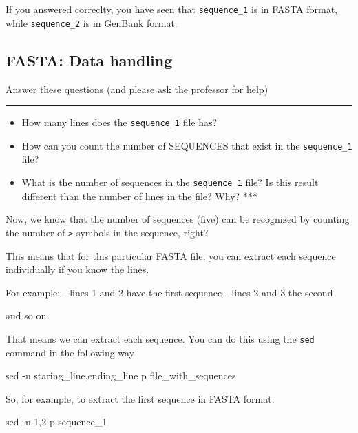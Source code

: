 \documentclass[
]{book}
\newenvironment{Shaded}{\begin{snugshade}}{\end{snugshade}}
\newcommand{\AttributeTok}[1]{\textcolor[rgb]{0.77,0.63,0.00}{#1}}
\newcommand{\FunctionTok}[1]{\textcolor[rgb]{0.00,0.00,0.00}{#1}}
\newcommand{\NormalTok}[1]{#1}
\newcommand{\StringTok}[1]{\textcolor[rgb]{0.31,0.60,0.02}{#1}}
\providecommand{\tightlist}{%
  \setlength{\itemsep}{0pt}\setlength{\parskip}{0pt}}
\begin{document}
If you answered correclty, you have seen that \texttt{sequence\_1} is in FASTA format, while \texttt{sequence\_2} is in GenBank format.

\hypertarget{fasta-data-handling}{%
\subsection{FASTA: Data handling}\label{fasta-data-handling}}

Answer these questions (and please ask the professor for help)

\begin{center}\rule{0.5\linewidth}{0.5pt}\end{center}

\begin{itemize}
\tightlist
\item
  How many lines does the \texttt{sequence\_1} file has?
\item
  How can you count the number of SEQUENCES that exist in the \texttt{sequence\_1} file?
\item
  What is the number of sequences in the \texttt{sequence\_1} file? Is this result different than the number of lines in the file? Why?
  ***
\end{itemize}

Now, we know that the number of sequences (five) can be recognized by counting the number of \texttt{\textgreater{}} symbols in the sequence, right?

This means that for this particular FASTA file, you can extract each sequence individually if you know the lines.

For example:
- lines 1 and 2 have the first sequence
- lines 2 and 3 the second

and so on.

That means we can extract each sequence. You can do this using the \texttt{sed} command in the following way

\begin{Shaded}
\begin{Highlighting}[]
\FunctionTok{sed} \AttributeTok{{-}n} \StringTok{\textquotesingle{}staring\_line,ending\_line p\textquotesingle{}}\NormalTok{ file\_with\_sequences}
\end{Highlighting}
\end{Shaded}

So, for example, to extract the first sequence in FASTA format:

\begin{Shaded}
\begin{Highlighting}[]
\FunctionTok{sed} \AttributeTok{{-}n} \StringTok{\textquotesingle{}1,2 p\textquotesingle{}}\NormalTok{ sequence\_1}
\end{Highlighting}
\end{Shaded}
\end{document}
